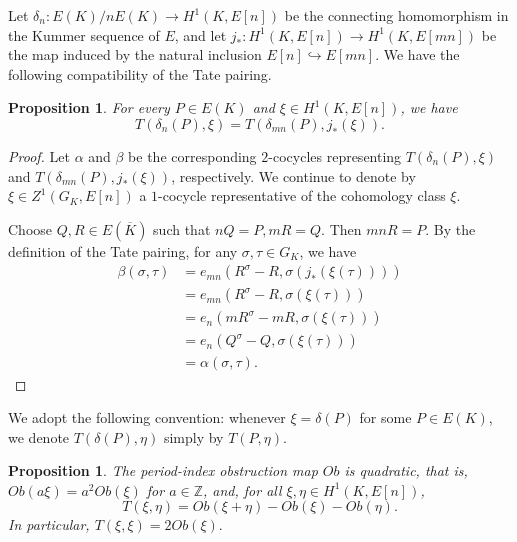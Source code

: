 \documentclass[11pt,a4paper]{amsart}
\newtheorem{proposition}[theorem]{Proposition}
\theoremstyle{definition}
\numberwithin{equation}{section}
\begin{document}
 Let $
 \delta_n:E(K)/nE(K)\longrightarrow H^1(K,E[n])$
 be the connecting homomorphism in the Kummer sequence of \(E\), and let $
 j_*:H^1(K,E[n])\longrightarrow H^1(K,E[mn])$
 be the map induced by the natural inclusion \(E[n]\hookrightarrow E[mn]\). We have the following compatibility of the Tate pairing.
 \begin{proposition}\label{tate2}
 	For every \(P\in E(K)\) and \(\xi\in H^1(K,E[n])\), we have
 	\[
 	T(\delta_n(P),\xi)
 	=
 	T(\delta_{mn}(P),j_*(\xi)).
 	\]
 \end{proposition}
\begin{proof}
Let \(\alpha\) and \(\beta\) be the corresponding \(2\)-cocycles
representing
$T(\delta_n(P),\xi)$ and $T(\delta_{mn}(P),j_*(\xi))$,
respectively. We continue to denote by
\(\xi\in Z^1(G_K,E[n])\) a \(1\)-cocycle representative of the
cohomology class \(\xi\).

Choose \(Q,R\in E(\overline{K})\) such that $nQ=P, mR=Q.$ Then \(mnR=P\). By the definition of the Tate pairing, for any \(\sigma,\tau\in G_K\), we have
\[
\begin{aligned}
	\beta(\sigma,\tau)
	&=e_{mn}(R^\sigma-R,\sigma(j_*(\xi(\tau))))\\
	&=e_{mn}(R^\sigma-R,\sigma(\xi(\tau)))\\
	&=e_n(mR^\sigma-mR,\sigma(\xi(\tau)))\\
	&=e_n(Q^\sigma-Q,\sigma(\xi(\tau)))\\
	&=\alpha(\sigma,\tau).
\end{aligned}
\]
\end{proof}
 We adopt the following convention: whenever \(\xi=\delta(P)\) for some \(P\in E(K)\), we denote \(T(\delta(P),\eta)\) simply by \(T(P,\eta)\).
\begin{proposition}\label{ff}\cite[Proposition 4.1, Proposition 4.3]{ONeil}
 The period-index obstruction map $Ob$ is quadratic, that is,
 $
  Ob(a\xi)=a^2Ob(\xi)
  $
  for $a\in \mathbb{Z}$, and, for all $\xi,\eta \in H^1(K,E[n])$, 
	\begin{equation}
		T(\xi,\eta)=Ob(\xi+\eta)-Ob(\xi)-Ob(\eta).
	\end{equation}
In particular, 
$
T(\xi,\xi)=2Ob(\xi).
$
\end{proposition}
\end{document}
